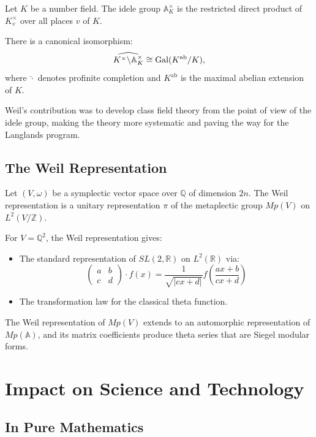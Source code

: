 Let $K$ be a number field. The idele group $\mathbb{A}_K^\times$ is the restricted direct product of $K_v^\times$ over all places $v$ of $K$.

\begin{theorem}
There is a canonical isomorphism:
\[
\widehat{K^\times \backslash \mathbb{A}_K^\times} \cong \operatorname{Gal}(K^{\text{ab}}/K),
\]
where $\widehat{\cdot}$ denotes profinite completion and $K^{\text{ab}}$ is the maximal abelian extension of $K$.
\end{theorem}

Weil's contribution was to develop class field theory from the point of view of the idele group, making the theory more systematic and paving the way for the Langlands program.

\subsection{The Weil Representation}

Let $(V, \omega)$ be a symplectic vector space over $\mathbb{Q}$ of dimension $2n$. The Weil representation is a unitary representation $\pi$ of the metaplectic group $Mp(V)$ on $L^2(V/\mathbb{Z})$.

For $V = \mathbb{Q}^2$, the Weil representation gives:
\begin{itemize}
    \item The standard representation of $SL(2,\mathbb{R})$ on $L^2(\mathbb{R})$ via:
    \[
    \begin{pmatrix} a & b \\ c & d \end{pmatrix} \cdot f(x) = \frac{1}{\sqrt{|cx + d|}} f\left(\frac{ax + b}{cx + d}\right)
    \]
    \item The transformation law for the classical theta function.
\end{itemize}

\begin{theorem}[Weil, 1964]
The Weil representation of $Mp(V)$ extends to an automorphic representation of $Mp(\mathbb{A})$, and its matrix coefficients produce theta series that are Siegel modular forms.
\end{theorem}

\section{Impact on Science and Technology}

\subsection{In Pure Mathematics}

